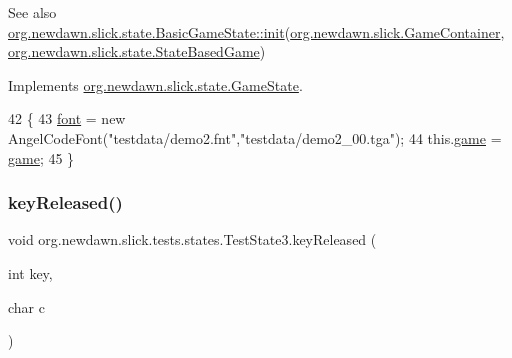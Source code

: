 \begin{DoxySeeAlso}{See also}
\mbox{\hyperlink{interfaceorg_1_1newdawn_1_1slick_1_1state_1_1_game_state_aa799a369e0fcfe6822d2d586fa6f5bbc}{org.\+newdawn.\+slick.\+state.\+Basic\+Game\+State\+::init}}(\mbox{\hyperlink{classorg_1_1newdawn_1_1slick_1_1_game_container}{org.\+newdawn.\+slick.\+Game\+Container}}, \mbox{\hyperlink{classorg_1_1newdawn_1_1slick_1_1state_1_1_state_based_game}{org.\+newdawn.\+slick.\+state.\+State\+Based\+Game}}) 
\end{DoxySeeAlso}


Implements \mbox{\hyperlink{interfaceorg_1_1newdawn_1_1slick_1_1state_1_1_game_state_aa799a369e0fcfe6822d2d586fa6f5bbc}{org.\+newdawn.\+slick.\+state.\+Game\+State}}.


\begin{DoxyCode}
42                                                                                          \{
43         \mbox{\hyperlink{classorg_1_1newdawn_1_1slick_1_1tests_1_1states_1_1_test_state3_a7e7969f51b4cab9b70539243e13703f0}{font}} = \textcolor{keyword}{new} AngelCodeFont(\textcolor{stringliteral}{"testdata/demo2.fnt"},\textcolor{stringliteral}{"testdata/demo2\_00.tga"});
44         this.\mbox{\hyperlink{classorg_1_1newdawn_1_1slick_1_1tests_1_1states_1_1_test_state3_a769f07538782627db0be9ce0043b356f}{game}} = \mbox{\hyperlink{classorg_1_1newdawn_1_1slick_1_1tests_1_1states_1_1_test_state3_a769f07538782627db0be9ce0043b356f}{game}};
45     \}
\end{DoxyCode}
\mbox{\label{classorg_1_1newdawn_1_1slick_1_1tests_1_1states_1_1_test_state3_ae86e8703517f69bd92b44b4cebeac8fc}} 
\subsubsection{\texorpdfstring{key\+Released()}{keyReleased()}}
{\footnotesize\ttfamily void org.\+newdawn.\+slick.\+tests.\+states.\+Test\+State3.\+key\+Released (\begin{DoxyParamCaption}\item[{int}]{key,  }\item[{char}]{c }\end{DoxyParamCaption})\hspace{0.3cm}{\ttfamily [inline]}}

